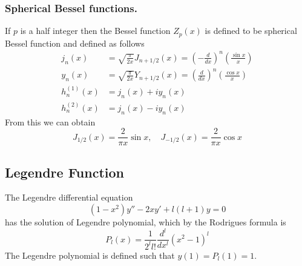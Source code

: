\documentclass[../main.tex]{subfiles}
\begin{document}
\subsubsection*{Spherical Bessel functions.} If $p$ is a half integer
then the Bessel function $Z_p(x)$ is defined to be spherical Bessel function and defined as follows
\begin{align*}
    j_n(x)       & =\sqrt{\frac{\pi}{2x}}J_{n+1/2}(x)=\left(-\frac{d}{dx}\right)^n\left(\frac{\sin x}{x}\right) \\
    y_n(x)       & =\sqrt{\frac{\pi}{2x}}Y_{n+1/2}(x)=\left(\frac{d}{dx}\right)^n\left(\frac{\cos x}{x}\right)  \\
    h_n^{(1)}(x) & =j_n(x)+iy_n(x)                                                                              \\
    h_n^{(2)}(x) & =j_n(x)-iy_n(x)
\end{align*}
From this we can obtain
\begin{equation*}
    J_{1/2}(x)=\frac{2}{\pi x}\sin x, \quad J_{-1/2}(x)=\frac{2}{\pi x}\cos x
\end{equation*}

\subsection*{Legendre Function}
The Legendre differential equation
\begin{equation*}
    (1-x^2)y''-2xy'+l(l+1)y=0
\end{equation*}
has the solution of Legendre polynomial, which by the Rodrigues formula is
\begin{equation*}
    P_l(x)=\frac{1}{2^ll!}\frac{d^l}{dx^l}(x^2-1)^l
\end{equation*}
The Legendre polynomial is defined such that $y(1)=P_l(1)=1$.
\end{document}
